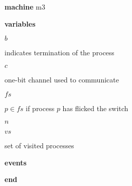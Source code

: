 \begin{block}
  \item   \textbf{machine} m3
  \item   \textbf{variables}
  \begin{block}
    \item   $b$
    \item   \begin{block}
      \item    indicates termination of the process 
    \end{block}
    \item   $c$
    \item   \begin{block}
      \item    one-bit channel used to communicate 
    \end{block}
    \item   $fs$
    \item   \begin{block}
      \item    $p \in fs$ if process $p$ has flicked the switch 
    \end{block}
    \item   $n$
    \item   $vs$
    \item   \begin{block}
      \item   set of visited processes
    \end{block}
  \end{block}
  \item   
  \item   
  \item   \textbf{events}
  \begin{block}
    \item   
    \item   
    \item   
    \item   
  \end{block}
  \item   \textbf{end} \\
\end{block}
